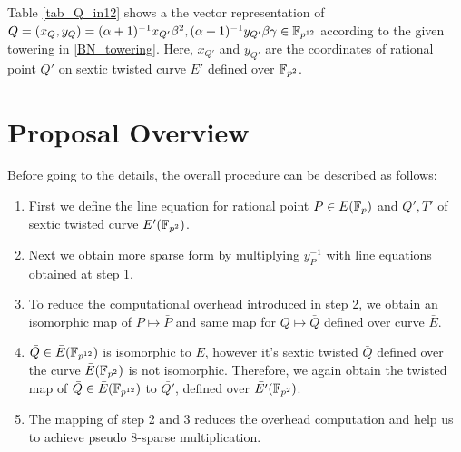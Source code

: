 Table \ref{tab_Q_in12} shows a the vector representation of $Q = (x_{Q},y_Q) = (\alpha+1)^{-1}x_{Q'} \beta^2,(\alpha+1)^{-1}y_{Q'}\beta\gamma \in \mathbb{F}_{p^{12}}$ according to the given towering in \eqref{BN_towering}. Here, $x_{Q'}$ and $y_{Q'}$ are the coordinates of rational point $Q'$ on sextic twisted curve $E'$ defined over $\mathbb{F}_{p^2}$. 

\renewcommand{\baselinestretch}{1.5}
\begin{table*}[t]
\caption{$\g2$ rational point  $Q = (x_Q,y_Q) \in \FPTV$  vector representation}
\label{tab_Q_in12}
\centering
{}
\end{table*}
\renewcommand{\baselinestretch}{1.0}
\section{Proposal Overview}
Before going to the details, the overall procedure can be described as follows:
\begin{enumerate}
\item First we define the line equation for rational point $P \in E(\mathbb{F}_p)$ and $Q', T'$ of sextic twisted curve $E'(\mathbb{F}_{p^2})$.
\item Next we obtain more sparse form by multiplying $y_{P}^{-1}$ with line equations obtained at step 1.
\item To reduce the computational overhead introduced in step 2, we obtain an isomorphic map of $P \mapsto \bar{P}$ and same map for $Q \mapsto \bar{Q}$ defined over curve $\bar{E}$.
\item $\bar{Q} \in \bar{E}(\mathbb{F}_{p^{12}})$ is isomorphic to $E$, however it's sextic twisted $\bar{Q}$ defined over the curve $\bar{E}(\mathbb{F}_{p^2})$ is not isomorphic. Therefore, we again obtain the twisted map of $\bar{Q} \in \bar{E}(\mathbb{F}_{p^{12}})$ to $\bar{Q'}$, defined over $\bar{E'}(\mathbb{F}_{p^2})$.
\item The mapping of step 2 and 3 reduces the overhead computation and help us to achieve pseudo 8-sparse multiplication. 
\end{enumerate}

